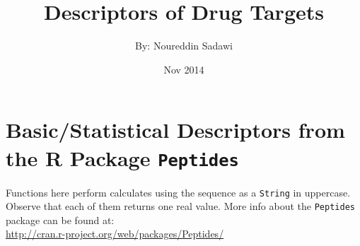 \documentclass[a4paper,12pt, english]{article}
\begin{document}
\title{Descriptors of Drug Targets}
\date{Nov 2014}
\author{By: Noureddin Sadawi}
\maketitle

\large
\section{Basic/Statistical Descriptors from the R Package \texttt{Peptides}}
Functions here perform calculates using the sequence as a \texttt{String} in uppercase. Observe that each of them returns one real value. More info about the \texttt{Peptides} package can be found at:\\
\url{http://cran.r-project.org/web/packages/Peptides/}
\end{document}
